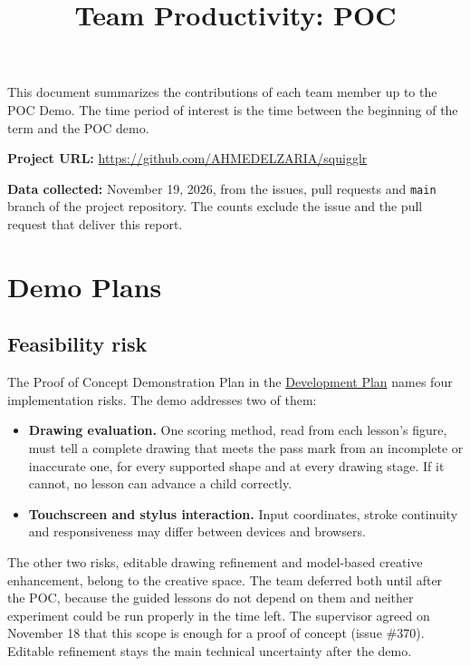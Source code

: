 \documentclass{article}
\title{Team Productivity: POC\\\progname}
\author{\authname}
\date{}
\begin{document}
\maketitle

This document summarizes the contributions of each team member up to the POC
Demo.  The time period of interest is the time between the beginning of the term
and the POC demo.

\medskip

\noindent \textbf{Project URL:}
\url{https://github.com/AHMEDELZARIA/squigglr}

\noindent \textbf{Data collected:} November 19, 2026, from the issues, pull
requests and \texttt{main} branch of the project repository. The counts
exclude the issue and the pull request that deliver this report.

\section{Demo Plans}

\subsection*{Feasibility risk}

The Proof of Concept Demonstration Plan in the
\href{https://github.com/AHMEDELZARIA/squigglr/blob/main/pdfs/DevelopmentPlan/DevelopmentPlan.pdf}
{Development Plan} names four implementation risks. The demo addresses two
of them:

\begin{itemize}
    \item \textbf{Drawing evaluation.} One scoring method, read from each
    lesson's figure, must tell a complete drawing that meets the pass mark
    from an incomplete or inaccurate one, for every supported shape and at
    every drawing stage. If it cannot, no lesson can advance a child
    correctly.
    \item \textbf{Touchscreen and stylus interaction.} Input coordinates,
    stroke continuity and responsiveness may differ between devices and
    browsers.
\end{itemize}

The other two risks, editable drawing refinement and model-based creative
enhancement, belong to the creative space. The team deferred both until
after the POC, because the guided lessons do not depend on them and neither
experiment could be run properly in the time left. The supervisor agreed on
November 18 that this scope is enough for a proof of concept (issue \#370).
Editable refinement stays the main technical uncertainty after the demo.
\end{document}
